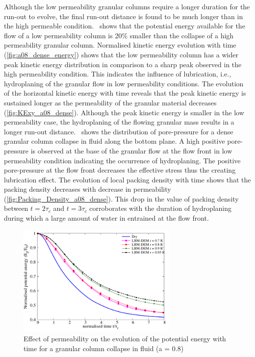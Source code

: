 Although the low permeability granular columns require a longer duration for 
the run-out to evolve, the final run-out distance is found to be much longer 
than in the high permeable condition.~ shows that the 
potential energy available for the flow of a low permeability column is 20\% 
smaller than the collapse of a high permeability granular column. Normalised 
kinetic energy evolution with time (\cref{fig:a08_dense_energy}) shows that the 
low permeability column has a wider peak kinetic energy distribution in 
comparison to a sharp peak observed in the high permeability condition. This 
indicates the influence of lubrication, i.e., hydroplaning of the granular flow 
in low permeability conditions. The evolution of the horizontal kinetic energy 
with time reveals that the peak kinetic energy is sustained longer as the 
permeability of the granular material decreases (\cref{fig:KExy_a08_dense}). 
Although the peak kinetic energy is smaller in the low permeability case, the 
hydroplaning of the flowing granular mass results in a longer run-out 
distance.~ shows the 
distribution of pore-pressure for a dense granular column collapse in fluid 
along the bottom plane. A high positive pore-pressure is observed 
at the base of the granular flow at the flow front in low permeability 
condition indicating the occurrence of hydroplaning. The positive pore-pressure 
at the flow front decreases the effective stress thus the creating lubrication 
effect. The evolution of local packing density with time shows that the packing 
density decreases with decrease in permeability 
(\cref{fig:Packing_Density_a08_dense}). This drop 
in the value of packing density between $t = 2\tau_c$ and $t=3\tau_c$ 
corroborates with the duration of hydroplaning during which a large amount of 
water in entrained at the flow front.

\begin{figure}
	\centering
    \includegraphics[width=0.7\textwidth]{PE_a08_dense}
    \caption{Effect of permeability on the evolution of the potential energy 
    with time for a granular column collapse in fluid (a = 0.8)}
    \label{fig:PE_a08_dense}
\end{figure}


